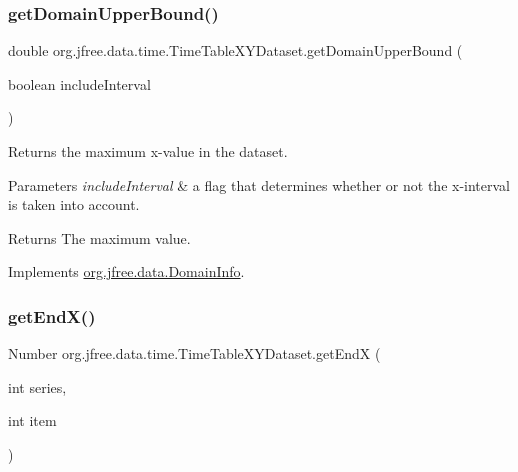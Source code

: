 \mbox{\label{classorg_1_1jfree_1_1data_1_1time_1_1_time_table_x_y_dataset_ae597f42b0c5c2b5b9b7515e1af48c5ba}} 
\subsubsection{\texorpdfstring{get\+Domain\+Upper\+Bound()}{getDomainUpperBound()}}
{\footnotesize\ttfamily double org.\+jfree.\+data.\+time.\+Time\+Table\+X\+Y\+Dataset.\+get\+Domain\+Upper\+Bound (\begin{DoxyParamCaption}\item[{boolean}]{include\+Interval }\end{DoxyParamCaption})}

Returns the maximum x-\/value in the dataset.


\begin{DoxyParams}{Parameters}
{\em include\+Interval} & a flag that determines whether or not the x-\/interval is taken into account.\\
\hline
\end{DoxyParams}
\begin{DoxyReturn}{Returns}
The maximum value. 
\end{DoxyReturn}


Implements \mbox{\hyperlink{interfaceorg_1_1jfree_1_1data_1_1_domain_info_a00e455f8db5bd8515266000cacc74e89}{org.\+jfree.\+data.\+Domain\+Info}}.

\mbox{\label{classorg_1_1jfree_1_1data_1_1time_1_1_time_table_x_y_dataset_abc416a9ea2a52c7412141e7f0f15bd6a}} 
\subsubsection{\texorpdfstring{get\+End\+X()}{getEndX()}}
{\footnotesize\ttfamily Number org.\+jfree.\+data.\+time.\+Time\+Table\+X\+Y\+Dataset.\+get\+EndX (\begin{DoxyParamCaption}\item[{int}]{series,  }\item[{int}]{item }\end{DoxyParamCaption})}


